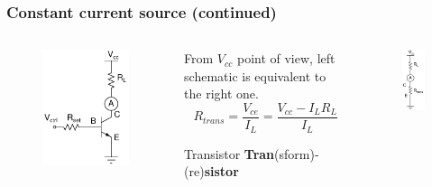 \documentclass[beamer]{standalone}
\begin{document}
\begin{frame}
\frametitle{Constant current source (continued)}
	\begin{columns}[c]
		\begin{column}{.25\textwidth}
			\begin{figure}
				\includegraphics[height=0.30\textheight]{./schematics/npn_constant_current_source.pdf}
			\end{figure}
		\end{column}
		\begin{column}{.6\textwidth}
			From $V_{cc}$ point of view,
			left schematic is equivalent to the right one.
			\[
			R_{trans} = \frac{ V_{ce}} {I_L}
			= \frac{V_{cc} - I_L R_L}{I_L}
			\]
			\begin{block}{Transistor}
				{\bf Tran}(sform)-(re){\bf sistor}
			\end{block}
		\end{column}
		\begin{column}{.25\textwidth}
			\begin{figure}
				\includegraphics[height=0.30\textheight]{./schematics/npn_constant_current_source_equivalent.pdf}

\end{figure}
\end{column}
\end{columns}
\end{frame}
\end{document}
